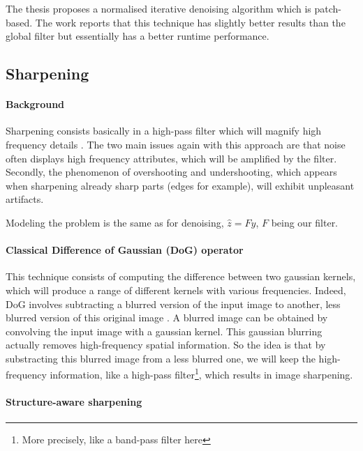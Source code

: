The thesis \cite{kheradmand_graph-based_2016} proposes a normalised iterative denoising algorithm which is patch-based.
The work reports that this technique has slightly better results than the global filter but essentially has a better runtime performance.

\subsection{Sharpening}

\paragraph{Background}

Sharpening consists basically in a high-pass filter which will magnify high frequency details \cite{kheradmand_graph-based_2016}.
The two main issues again with this approach are that noise often displays high frequency attributes, which will be amplified by the filter.
Secondly, the phenomenon of overshooting and undershooting, which appears when sharpening already sharp parts (edges for example), will exhibit unpleasant artifacts.

Modeling the problem is the same as for denoising, \(\hat{z} = Fy\), \(F\) being our filter.

\paragraph{Classical Difference of Gaussian (DoG) operator}

This technique consists of computing the difference between two gaussian kernels, which will produce a range of different kernels with various frequencies.
Indeed, DoG involves subtracting a blurred version of the input image to another, less blurred version of this original image \cite{wiki:Difference_of_Gaussians}.
A blurred image can be obtained by convolving the input image with a gaussian kernel.
This gaussian blurring actually removes high-frequency spatial information.
So the idea is that by substracting this blurred image from a less blurred one, we will keep the high-frequency information, like a high-pass filter\footnote{More precisely, like a band-pass filter here}, which results in image sharpening.

\paragraph{Structure-aware sharpening}

